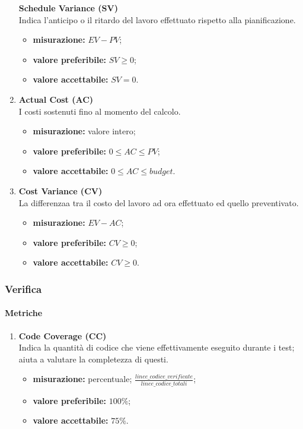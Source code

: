 \begin{enumerate}
	      \textbf{Schedule Variance (SV)}\\
	      Indica l'anticipo o il ritardo del lavoro effettuato rispetto alla pianificazione.
	      \begin{itemize}
		      \item \textbf{misurazione:} $EV-PV$;
		      \item \textbf{valore preferibile:} $SV\geq 0$;
		      \item \textbf{valore accettabile:} $SV=0$.
	      \end{itemize}
	\item[]
	      \textbf{Actual Cost (AC)}\\
	      I costi sostenuti fino al momento del calcolo.
	      \begin{itemize}
		      \item \textbf{misurazione:} valore intero;
		      \item \textbf{valore preferibile:} $0\leq AC\leq PV$;
		      \item \textbf{valore accettabile:} $0\leq AC\leq budget$.
	      \end{itemize}
	\item[]
	      \textbf{Cost Variance (CV)}\\
	      La differenzaa tra il costo del lavoro ad ora effettuato ed quello preventivato.
	      \begin{itemize}
		      \item \textbf{misurazione:} $EV-AC$;
		      \item \textbf{valore preferibile:} $CV\geq 0$;
		      \item \textbf{valore accettabile:} $CV\geq 0$.
	      \end{itemize}
\end{enumerate}
\subsubsection{Verifica}
\paragraph{Metriche}
\begin{enumerate}
	\item[]
	      \textbf{Code Coverage (CC)}\\
	      Indica la quantità di codice che viene effettivamente eseguito durante i test; aiuta a valutare la completezza di questi.
	      \begin{itemize}
		      \item \textbf{misurazione:} percentuale; $\frac{linee\_codice\_verificate}{linee\_codice\_totali}$;
		      \item \textbf{valore preferibile:} $100\%$;
		      \item \textbf{valore accettabile:} $75\%$.
	      \end{itemize}
\end{enumerate}
